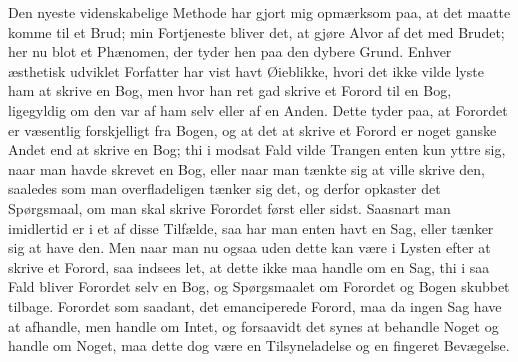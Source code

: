\documentclass[12pt,a4paper]{article}
\begin{document}
Den nyeste videnskabelige Methode har gjort mig opmærksom paa, at det maatte komme til et Brud; min Fortjeneste bliver det, at gjøre Alvor af det med Brudet; her nu blot et Phænomen, der tyder hen paa den dybere Grund. Enhver æsthetisk udviklet Forfatter har vist havt Øieblikke, hvori det ikke vilde lyste ham at skrive en Bog, men hvor han ret gad skrive et Forord til en Bog, ligegyldig om den var af ham selv eller af en Anden. Dette tyder paa, at Forordet er væsentlig forskjelligt fra Bogen, og at det at skrive et Forord er noget ganske Andet end at skrive en Bog; thi i modsat Fald vilde Trangen enten kun yttre sig, naar man havde skrevet en Bog, eller naar man tænkte sig at ville skrive den, saaledes som man overfladeligen tænker sig det, og derfor opkaster det Spørgsmaal, om man skal skrive Forordet først eller sidst. Saasnart man imidlertid er i et af disse Tilfælde, saa har man enten havt en Sag, eller tænker sig at have den. Men naar man nu ogsaa uden dette kan være i Lysten efter at skrive et Forord, saa indsees let, at dette ikke maa handle om en Sag, thi i saa Fald bliver Forordet selv en Bog, og Spørgsmaalet om Forordet og Bogen skubbet tilbage. Forordet som saadant, det emanciperede Forord, maa da ingen Sag have at afhandle, men handle om Intet, og forsaavidt det synes at behandle Noget og handle om Noget, maa dette dog være en Tilsyneladelse og en fingeret Bevægelse.
\end{document}
